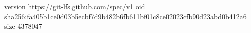 version https://git-lfs.github.com/spec/v1
oid sha256:fa405b1ce0d03b5ecbf7d9b482b6fb611bf01c8ce02023cfb90d23abd0b412a6
size 4378047
